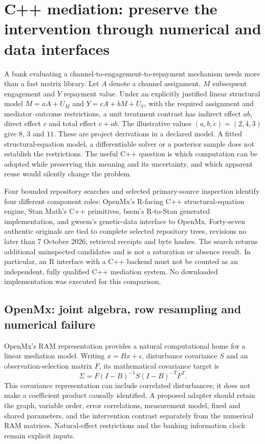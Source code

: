 \section[C++ mediation and numerical contracts]{C++ mediation: preserve the intervention through numerical and data interfaces}
\label{sec:exec25-cmed}

A bank evaluating a channel-to-engagement-to-repayment mechanism needs more
than a fast matrix library. Let $A$ denote a channel assignment, $M$ subsequent
engagement and $Y$ repayment value. Under an explicitly justified linear
structural model $M=aA+U_M$ and $Y=cA+bM+U_Y$, with the required assignment
and mediator--outcome restrictions, a unit treatment contrast has indirect
effect $ab$, direct effect $c$ and total effect $c+ab$. The illustrative values
$(a,b,c)=(2,4,3)$ give $8$, $3$ and $11$. These are project derivations in a
declared model. A fitted structural-equation model, a differentiable solver or
a posterior sample does not establish the restrictions. The useful C++ question
is which computation can be adopted while preserving this meaning and its
uncertainty, and which apparent reuse would silently change the problem.

Four bounded repository searches and selected primary-source inspection identify
four different component roles: OpenMx's R-facing C++ structural-equation engine,
Stan Math's C++ primitives, bsem's R-to-Stan generated implementation, and gwsem's
genetic-data interface to OpenMx. Forty-seven authentic originals are tied to
complete selected repository trees, revisions no later than 7 October 2026,
retrieval receipts and byte hashes. The search returns additional uninspected
candidates and is not a saturation or absence result. In particular, an R
interface with a C++ backend must not be counted as an independent, fully
qualified C++ mediation system. No downloaded implementation was executed for
this comparison.\citep{exec25_cmed_choice}

\subsection{OpenMx: joint algebra, row resampling and numerical failure}

OpenMx's RAM representation provides a natural computational home for a linear
mediation model. Writing $x=Bx+\epsilon$, disturbance covariance $S$ and an
observation-selection matrix $F$, its mathematical covariance target is
\[
 \Sigma=F(I-B)^{-1}S(I-B)^{-T}F^T.
\]
This covariance representation can include correlated disturbances; it does not
make a coefficient product causally identified. A proposed adapter should retain
the graph, variable order, error correlations, measurement model, fixed and
shared parameters, and the intervention contrast separately from the numerical
RAM matrices. Natural-effect restrictions and the banking information clock
remain explicit inputs.\citep{exec25_cmed_openmx}

